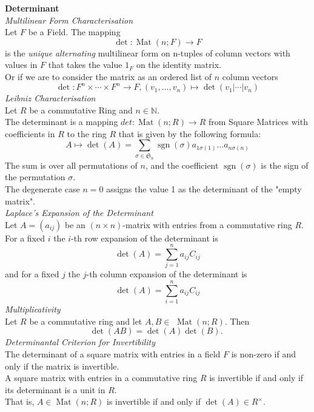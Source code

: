 \documentclass[a4paper, 10pt]{article}
\begin{document}
\begin{multicols*}{3}
\textbf{Determinant}\\
\textit{Multilinear Form Characterisation}\\
Let $F$ be a Field. The mapping
\[
\operatorname{det}: \operatorname{Mat}(n ; F) \rightarrow F
\]
is the \textit{unique} \textit{alternating} multilinear form on n-tuples of column vectors with values in $F$ that takes the value $1_F$ on the identity matrix.\\
Or if we are to consider the matrix as an ordered list of $n$ column vectors
\[
\operatorname{det}: F^n \times \cdots \times F^n \rightarrow F,\left(v_1, \ldots, v_n\right) \mapsto \operatorname{det}\left(v_1|\cdots| v_n\right)
\]
\textit{Leibniz Characterisation}\\
Let $R$ be a commutative Ring and $n \in \mathbb{N}$. \\
The determinant is a mapping $det : \operatorname{Mat}(n ; R) \rightarrow R$ from Square Matrices with coefficients in $R$ to the ring $R$ that is given by the following formula:
\[
A \mapsto \operatorname{det}(A)=\sum_{\sigma \in \mathfrak{S}_n} \operatorname{sgn}(\sigma) a_{1 \sigma(1)} \ldots a_{n \sigma(n)}
\]
The sum is over all permutations of $n$, and the coefficient $\operatorname{sgn}(\sigma)$ is the sign of the permutation $\sigma$. \\
The degenerate case $n=0$ assigns the value 1 as the determinant of the "empty matrix".\\
\textit{Laplace’s Expansion of the Determinant}\\
Let $A=\left(a_{i j}\right)$ be an $(n \times n)$-matrix with entries from a commutative ring $R$. For a fixed $i$ the $i$-th row expansion of the determinant is
\[
\operatorname{det}(A)=\sum_{j=1}^n a_{i j} C_{i j}
\]
and for a fixed $j$ the $j$-th column expansion of the determinant is
\[
\operatorname{det}(A)=\sum_{i=1}^n a_{i j} C_{i j}
\]
\textit{Multiplicativity}\\
Let $R$ be a commutative ring and let $A, B \in$ $\operatorname{Mat}(n ; R)$. Then
\[
\operatorname{det}(A B)=\operatorname{det}(A) \operatorname{det}(B) \text {. }
\]
\textit{Determinantal Criterion for Invertibility} \\
The determinant of a square matrix with entries in a field $F$ is non-zero if and only if the matrix is invertible. \\
A square matrix with entries in a commutative ring $R$ is invertible if and only if its determinant is a unit in $R$. \\
That is, $A \in \operatorname{Mat}(n ; R)$ is invertible if and only if $\operatorname{det}(A) \in R^{\times}$.

\end{multicols*}
\end{document}
